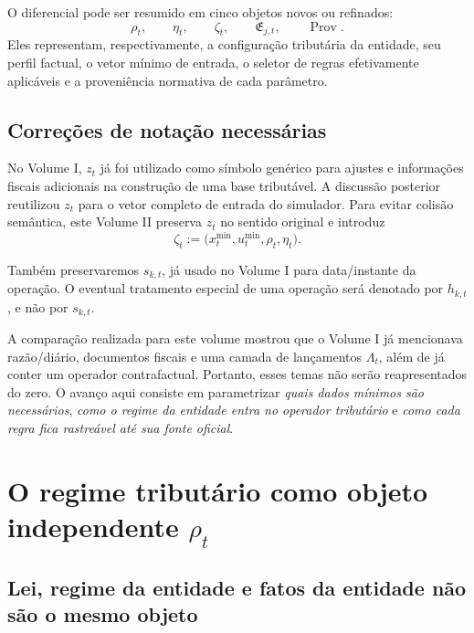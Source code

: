 \documentclass[11pt,a4paper]{article}
\newcommand{\Prov}{\operatorname{Prov}}
\begin{document}
\begin{formalizacao}
O diferencial pode ser resumido em cinco objetos novos ou refinados:
\[
\boxed{
\rho_t,\qquad \eta_t,\qquad \zeta_t,\qquad \mathfrak E_{j,t},\qquad \Prov.
}
\]
Eles representam, respectivamente, a configuração tributária da entidade, seu perfil factual, o vetor mínimo de entrada, o seletor de regras efetivamente aplicáveis e a proveniência normativa de cada parâmetro.
\end{formalizacao}

\subsection{Correções de notação necessárias}

No Volume I, $z_t$ já foi utilizado como símbolo genérico para ajustes e informações fiscais adicionais na construção de uma base tributável. A discussão posterior reutilizou $z_t$ para o vetor completo de entrada do simulador. Para evitar colisão semântica, este Volume II preserva $z_t$ no sentido original e introduz
\begin{equation}
\boxed{\zeta_t:=\bigl(x_t^{\min},u_t^{\min},\rho_t,\eta_t\bigr).}
\label{eq:zeta}
\end{equation}

Também preservaremos $s_{k,t}$, já usado no Volume I para data/instante da operação. O eventual tratamento especial de uma operação será denotado por $h_{k,t}$, e não por $s_{k,t}$.

\begin{cuidado}
A comparação realizada para este volume mostrou que o Volume I já mencionava razão/diário, documentos fiscais e uma camada de lançamentos $\Lambda_t$, além de já conter um operador contrafactual. Portanto, esses temas não serão reapresentados do zero. O avanço aqui consiste em parametrizar \emph{quais dados mínimos são necessários}, \emph{como o regime da entidade entra no operador tributário} e \emph{como cada regra fica rastreável até sua fonte oficial}.
\end{cuidado}

\section{O regime tributário como objeto independente $\rho_t$}

\subsection{Lei, regime da entidade e fatos da entidade não são o mesmo objeto}
\end{document}
